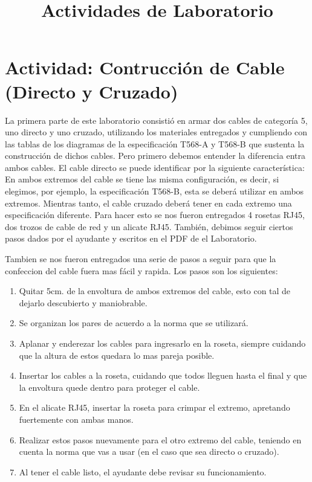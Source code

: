 \documentclass[onecolumn,11pts]{IEEEtran}
\begin{document}
\cleardoublepage

\title{Actividades de Laboratorio}

\maketitle

\section{Actividad: Contrucción de Cable (Directo y Cruzado)}

       La primera parte de este laboratorio consistió en armar dos cables de categoría 5, uno directo y uno cruzado, utilizando los materiales entregados y cumpliendo con las tablas de los diagramas de la especificación T568-A y T568-B que sustenta la construcción de dichos cables.
Pero primero debemos entender la diferencia entra ambos cables. El cable directo se puede identificar por la siguiente característica: En ambos extremos del cable se tiene las misma configuración, es decir, si elegimos, por ejemplo, la especificación T568-B, esta se deberá utilizar en ambos extremos. Mientras tanto, el cable cruzado deberá tener en cada extremo una especificación diferente.
Para hacer esto se nos fueron entregados 4 rosetas RJ45, dos trozos de cable de red y un alicate RJ45. También, debimos seguir ciertos pasos dados por el ayudante y escritos en el PDF de el Laboratorio.

       


        Tambien se nos fueron entregados una serie de pasos a seguir para que la confeccion del cable fuera mas fácil y rapida. Los pasos son los siguientes:

\begin{enumerate}
\item Quitar 5cm. de la envoltura de ambos extremos del cable, esto con tal de dejarlo descubierto y maniobrable.
\item Se organizan los pares de acuerdo a la norma que se utilizará.
\item Aplanar y enderezar los cables para ingresarlo en la roseta, siempre cuidando que la altura de estos quedara lo mas pareja posible.
\item Insertar los cables a la roseta, cuidando que todos lleguen hasta el final y que la envoltura quede dentro para proteger el cable.
\item En el alicate RJ45, insertar la roseta para crimpar el extremo, apretando fuertemente con ambas manos.
\item Realizar estos pasos nuevamente para el otro extremo del cable, teniendo en cuenta la norma que vas a usar (en el caso que sea directo o cruzado).
\item  Al tener el cable listo, el ayudante debe revisar su funcionamiento.
\end{enumerate}
\end{document}
